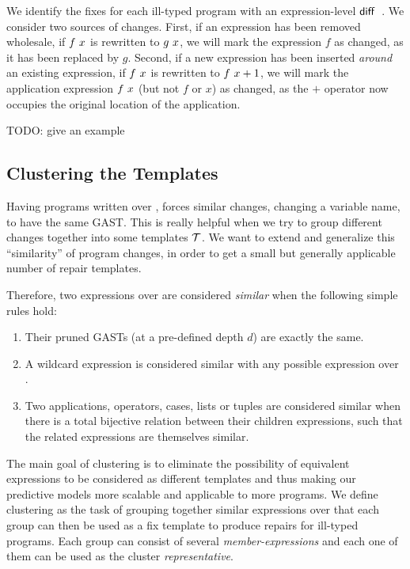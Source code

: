 We identify the fixes for each ill-typed program with an expression-level
$\mathsf{diff}$~\citep{Lempsink2009-xf}. We consider two sources of changes. First,
if an expression has been removed wholesale, \eg if $f\ x$ is rewritten
to $g\ x$, we will mark the expression $f$ as changed, as it has been
replaced by $g$. Second, if a new expression has been inserted \emph{around} an
existing expression, \eg if $f\ x$ is rewritten to
$f\ x + 1$, we will mark the application expression $f\ x$
(but not $f$ or $x$) as changed, as the $+$ operator now occupies the original
location of the application.

TODO: give an example


\subsection{Clustering the Templates}
\label{subsec:clustering}

Having programs written over \repairLang, forces similar changes, \ie changing a
variable name, to have the same GAST. This is really helpful when we try to
group different changes together into some templates $\mathcal{T}$. We want to extend and
generalize this ``similarity'' of program changes, in order to get a small but
generally applicable number of repair templates.

Therefore, two expressions over \repairLang are considered \emph{similar} when
the following simple rules hold:
\begin{enumerate}
    \item Their pruned GASTs (at a pre-defined depth $d$) are exactly the same.
    \item A wildcard expression is considered similar with any possible
    expression over \repairLang.
    \item Two applications, operators, cases, lists or tuples are considered
    similar when there is a total bijective relation between their children
    expressions, such that the related expressions are themselves similar.
\end{enumerate}


The main goal of clustering is to eliminate the possibility of equivalent
expressions to be considered as different templates and thus making our
predictive models more scalable and applicable to more programs. We define
clustering as the task of grouping together similar expressions over \repairLang
that each group can then be used as a fix template to produce repairs for
ill-typed programs. Each group can consist of several \emph{member-expressions}
and each one of them can be used as the cluster \emph{representative}.

